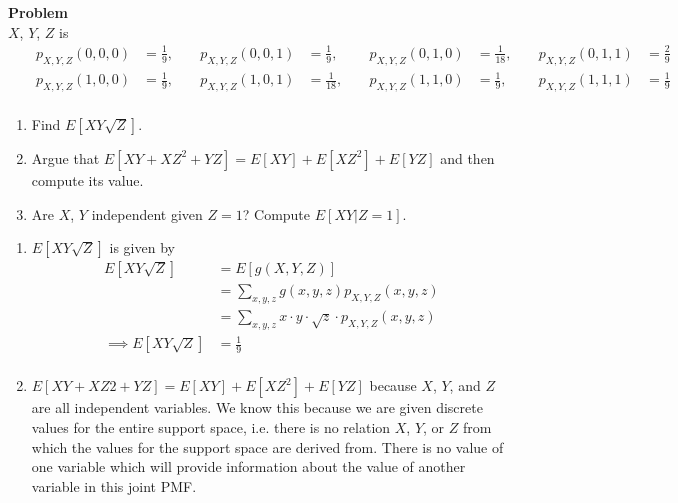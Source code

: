 \documentclass[12pt]{article}
\newenvironment{Ex}{\textbf{Problem}\vspace{.75em}\\}{}
\begin{document}
\begin{enumerate}
\begin{Ex}
    $X$, $Y$, $Z$ is
    \begin{equation*}
      \label{eq:4-question}
      \begin{aligned}
        &&p_{X,Y,Z}(0,0,0) &= \frac{1}{9},\;
        &&p_{X,Y,Z}(0,0,1) &= \frac{1}{9},\;
        &&p_{X,Y,Z}(0,1,0) &= \frac{1}{18},\;
        &&p_{X,Y,Z}(0,1,1) &= \frac{2}{9} \\
        &&p_{X,Y,Z}(1,0,0) &= \frac{1}{9},\;
        &&p_{X,Y,Z}(1,0,1) &= \frac{1}{18},\;
        &&p_{X,Y,Z}(1,1,0) &= \frac{1}{9},\;
        &&p_{X,Y,Z}(1,1,1) &= \frac{1}{9} \\
      \end{aligned}
    \end{equation*}
    \begin{enumerate}
    \item Find $E[XY\sqrt{Z}]$.
    \item Argue that $E[XY +XZ^2 +YZ] = E[XY]+E[XZ^2]+E[YZ]$ and then
      compute its value.
    \item Are $X$, $Y$ independent given $Z=1$? Compute $E[XY|Z = 1]$.
    \end{enumerate}
    \begin{solution} \hfill
      \begin{enumerate}
      \item $E[XY\sqrt{Z}]$ is given by
        \begin{equation}
          \label{eq:4a-sol}
          \begin{aligned}
            E[XY\sqrt{Z}] &= E[g(X,Y,Z)] \\
            &= \sum_{x,y,z} g(x,y,z)p_{X,Y,Z}(x,y,z) \\
            &= \sum_{x,y,z} x \cdot y \cdot \sqrt{z} \cdot
            p_{X,Y,Z}(x,y,z) \\
            \implies E[XY\sqrt{Z}] &= \frac{1}{9} \\
          \end{aligned}
        \end{equation}
      \item $E[XY +XZ2 +YZ] = E[XY]+E[XZ^2]+E[YZ]$ because $X$, $Y$,
        and $Z$ are all independent variables. We know this because we
        are given discrete values for the entire support space,
        i.e. there is no relation $X$, $Y$, or $Z$ from which the
        values for the support space are derived from. There is no
        value of one variable which will provide information about the
        value of another variable in this joint PMF.
        \begin{equation}

\end{equation}
\end{enumerate}
\end{solution}
\end{Ex}
\end{enumerate}
\end{document}
